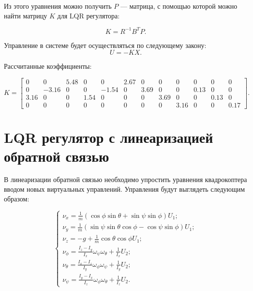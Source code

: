 Из этого уравнения можно получить \(P\) — матрица, с помощью которой можно найти матрицу \(K\) для LQR регулятора:

\begin{equation}
    K = R^{-1} B^T P.
\end{equation} 

Управление в системе будет осуществляться по следующему закону:
\begin{equation}
    U = -K X.
\end{equation}

Рассчитанные коэффициенты:

\[
    K =\begin{bmatrix}
        0 & 0 & 5.48 & 0 & 0 & 2.67 & 0 & 0 & 0 & 0 & 0 & 0 \\
        0 & -3.16 & 0 & 0 & -1.54 & 0 & 3.69 & 0 & 0 & 0.13 & 0 & 0 \\
        3.16 & 0 & 0 & 1.54 & 0 & 0 & 0 & 3.69 & 0 & 0 & 0.13 & 0 \\
        0 & 0 & 0 & 0 & 0 & 0 & 0 & 0 & 3.16 & 0 & 0 & 0.17
        \end{bmatrix}.
\]


\section{LQR регулятор с линеаризацией обратной связью}

В линеаризации обратной связью необходимо упростить уравнения квадрокоптера вводом 
новых виртуальных управлений. Управления будут выглядеть следующим образом:


\begin{equation}
    \begin{cases}
        \nu_x = \frac{1}{m} (\cos\phi \sin\theta  + \sin\psi \sin\phi) U_1;\\
        \nu_y = \frac{1}{m} (\sin\psi \sin\theta \cos\phi - \cos\psi \sin\phi) U_1;\\
        \nu_z = -g + \frac{1}{m} \cos\theta \cos\phi U_1;\\
        \nu_\phi = \frac{I_z - I_y}{I_x}\omega_\psi \omega_\theta + \frac{1}{I_x} U_2;\\
        \nu_\theta = \frac{I_x - I_z}{I_y}\omega_\phi \omega_\psi + \frac{1}{I_y} U_2;\\
        \nu_\psi = \frac{I_y - I_x}{I_z}\omega_\phi \omega_\theta + \frac{1}{I_z} U_2.
    \end{cases}
\end{equation}


